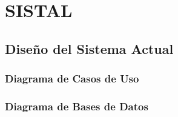 \chapter{SISTAL}




\section{Diseño del Sistema Actual}

\subsection{Diagrama de Casos de Uso}

\subsection{Diagrama de Bases de Datos}

